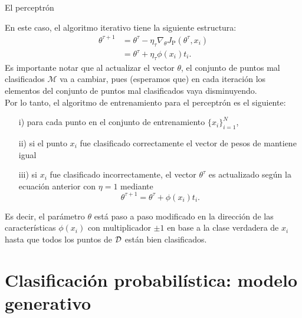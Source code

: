 \documentclass[handout, 9pt]{beamer}
\begin{document}
\begin{frame}{El perceptrón}

En este caso, el algoritmo iterativo tiene la siguiente estructura: \pause
\begin{align*}
  \theta^{\tau+1} &= \theta^\tau - \eta_\tau \nabla_\theta J_\text{P}(\theta^\tau,x_i)\nonumber\\
  &= \theta^\tau + \eta_\tau \phi(x_i)t_i.\label{eq:percetron_rule}
\end{align*}\pause
Es importante notar que al actualizar el vector $\theta$, el conjunto de puntos mal clasificados $\mathcal{M}$ va a cambiar, pues (esperamos que) en cada iteración los elementos del conjunto de puntos mal clasificados vaya disminuyendo.\\

Por lo tanto, el algoritmo de entrenamiento para el perceptrón es el siguiente: \pause

\begin{itemize}
  \item[i)] para cada punto en el conjunto de entrenamiento $\{x_i\}_{i=1}^N$, \pause
  \item[ii)] si el punto $x_i$ fue clasificado correctamente el vector de pesos de mantiene igual \pause
  \item[iii)] si $x_i$ fue clasificado incorrectamente, el vector $\theta^\tau$ es actualizado según la ecuación anterior con $\eta=1$ mediante
  \begin{equation*}
   \theta^{\tau+1} = \theta^\tau + \phi(x_i)t_i.
  \end{equation*} 
\end{itemize}
\pause
Es decir, el parámetro $\theta$ está paso a paso modificado en la dirección de las características $\phi(x_i)$ con multiplicador $\pm1$ en base a la clase verdadera de $x_i$ hasta  que todos los puntos de ${\mathcal D}$ están bien clasificados.


\end{frame}
\section{Clasificación probabilística: modelo generativo}
\end{document}
